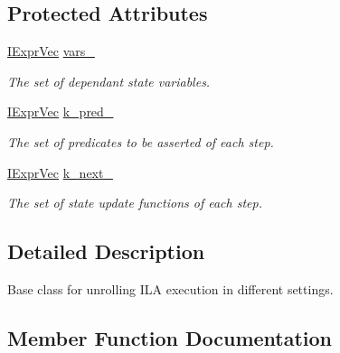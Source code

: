 \subsection*{Protected Attributes}
\begin{DoxyCompactItemize}
\item 
\mbox{\label{classilang_1_1_unroller_a84c608ea581d7e37074d2fd39af17eb5}} 
\mbox{\hyperlink{classilang_1_1_unroller_a60a486a0b0e6d269ce6507725708c22a}{I\+Expr\+Vec}} \mbox{\hyperlink{classilang_1_1_unroller_a84c608ea581d7e37074d2fd39af17eb5}{vars\+\_\+}}
\begin{DoxyCompactList}\small\item\em The set of dependant state variables. \end{DoxyCompactList}\item 
\mbox{\label{classilang_1_1_unroller_ae633aa1a9a92f23b8f251a503009e02e}} 
\mbox{\hyperlink{classilang_1_1_unroller_a60a486a0b0e6d269ce6507725708c22a}{I\+Expr\+Vec}} \mbox{\hyperlink{classilang_1_1_unroller_ae633aa1a9a92f23b8f251a503009e02e}{k\+\_\+pred\+\_\+}}
\begin{DoxyCompactList}\small\item\em The set of predicates to be asserted of each step. \end{DoxyCompactList}\item 
\mbox{\label{classilang_1_1_unroller_a2d03127d3f1f9d26b7b16519ae3fddeb}} 
\mbox{\hyperlink{classilang_1_1_unroller_a60a486a0b0e6d269ce6507725708c22a}{I\+Expr\+Vec}} \mbox{\hyperlink{classilang_1_1_unroller_a2d03127d3f1f9d26b7b16519ae3fddeb}{k\+\_\+next\+\_\+}}
\begin{DoxyCompactList}\small\item\em The set of state update functions of each step. \end{DoxyCompactList}\end{DoxyCompactItemize}


\subsection{Detailed Description}
Base class for unrolling I\+LA execution in different settings. 

\subsection{Member Function Documentation}
\mbox{\label{classilang_1_1_unroller_a97361e0a881ea09d32153166ef41dd82}} 
